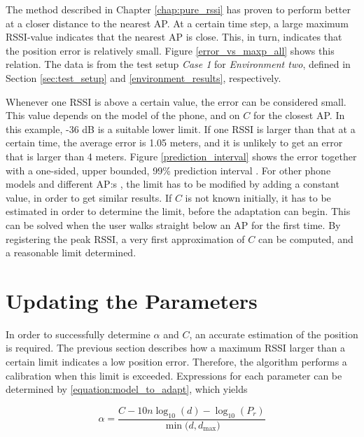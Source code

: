 \documentclass{LTHthesis}
\begin{document}
The method described in Chapter \ref{chap:pure_rssi} has proven to perform better at a closer distance to the nearest AP. At a certain time step, a large maximum RSSI-value indicates that the nearest AP is close. This, in turn, indicates that the position error is relatively small. Figure \ref{error_vs_maxp_all} shows this relation. The data is from the test setup \emph{Case 1} for \emph{Environment two}, defined in Section \ref{sec:test_setup} and \ref{environment_results}, respectively.

Whenever one RSSI is above a certain value, the error can be considered small. This value depends on the model of the phone, and on $C$ for the closest AP. In this example, -36 dB is a suitable lower limit. If one RSSI is larger than that at a certain time, the average error is 1.05 meters, and it is unlikely to get an error that is larger than 4 meters. Figure \ref{prediction_interval} shows the error together with a one-sided, upper bounded, 99\% prediction interval \cite{matstat}. For other phone models and different AP:s , the limit has to be modified by adding a constant value, in order to get similar results. If $C$ is not known initially, it has to be estimated in order to determine the limit, before the adaptation can begin.  This can be solved when the user walks straight below an AP for the first time. By registering the peak RSSI, a very first approximation of $C$ can be computed, and a reasonable limit determined.

%
\section{Updating the Parameters} %
%
In order to successfully determine $\alpha$ and $C$, an accurate estimation of the position is required. The previous section describes how a maximum RSSI larger than a certain limit indicates a low position error. Therefore, the algorithm performs a calibration when this limit is exceeded. Expressions for each parameter can be determined by \ref{equation:model_to_adapt}, which yields

%
\begin{equation}
\alpha=\frac{C-10n\log_{10}(d)-\log_{10}(P_r)}{\min({d, d_{\text{max}})}}
\label{equation:update_alpha}
\end{equation}
%
\end{document}

